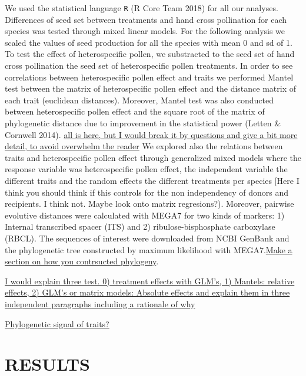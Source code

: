 \documentclass[11pt,a4paper]{article}
\begin{document}
We used the statistical language \texttt{R} (R Core Team 2018) for all
our analyses. Differences of seed set between treatments and hand cross
pollination for each species was tested through mixed linear models. For
the following analysis we scaled the values of seed production for all
the species with mean 0 and sd of 1. To test the effect of
heterospecific pollen, we substracted to the seed set of hand cross
pollination the seed set of heterospecific pollen treatments. In order
to see correlations between heterospecific pollen effect and traits we
performed Mantel test between the matrix of heterospecific pollen effect
and the distance matrix of each trait (euclidean distances). Moreover,
Mantel test was also conducted between heterospecific pollen effect and
the square root of the matrix of phylogenetic distance due to
improvement in the statistical power (Letten \& Cornwell 2014).
\href{}{all is here, but I would break it by questions and give a bit
more detail, to avoid overwhelm the reader} We explored also the
relations between traits and heterospecific pollen effect through
generalized mixed models where the response variable was heterospecific
pollen effect, the independent variable the different traits and the
random effects the different treatments per species {[}Here I think you
should think if this controls for the non independency of donors and
recipients. I think not. Maybe look onto matrix regresions?). Moreover,
pairwise evolutive distances were calculated with MEGA7 for two kinds of
markers: 1) Internal transcribed spacer (ITS) and 2)
ribulose-bisphosphate carboxylase (RBCL). The sequences of interest were
downloaded from NCBI GenBank and the phylogenetic tree constructed by
maximum likelihood with MEGA7.\href{}{Make a section on how you
contrsucted phylogeny}.

\href{}{I would explain three test. 0) treatment effects with GLM's, 1)
Mantels: relative effects, 2) GLM's or matrix models: Absolute effects
and explain them in three independent paragraphs including a rationale
of why}

\href{Jose}{Phylogenetic signal of traits?}

\newpage

\section{RESULTS}\label{results}
\end{document}
